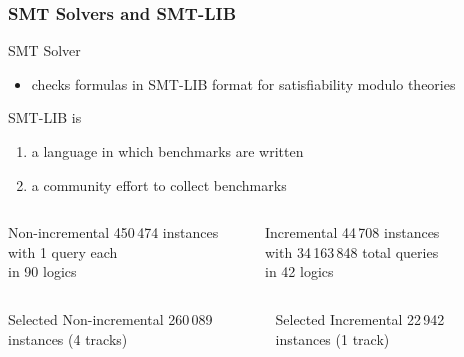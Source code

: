 \documentclass[table]{beamer}
\def\emph#1{\textcolor{MYblue}{#1}}
\begin{document}
\begin{frame}
  \frametitle{SMT Solvers and SMT-LIB}
  SMT Solver
  \begin{itemize}
  \item checks formulas
    in \emph{SMT-LIB} format
    for \emph{satisfiability modulo theories}
  \end{itemize}
  \bigskip

  SMT-LIB is
  \begin{enumerate}
  \item a \emph{language} in which benchmarks are written
  \item a community effort to \emph{collect benchmarks}
  \end{enumerate}
  \medskip

  \begin{columns}
    \begin{column}{0.4\textwidth}
      \begin{block}{Non-incremental}
        450\,474 instances \\
        with 1 query each \\
        in 90 logics
      \end{block}
    \end{column}
    \begin{column}{0.4\textwidth}
      \begin{block}{Incremental}
        44\,708 instances \\
        with 34\,163\,848 total queries \\
        in 42 logics
      \end{block}
    \end{column}
    \begin{column}{0.08\textwidth}
    \end{column}
  \end{columns}
  \pause
    \begin{columns}
    \begin{column}{0.4\textwidth}
      \begin{block}{Selected Non-incremental}
        260\,089 instances (4 tracks)
      \end{block}
    \end{column}
    \begin{column}{0.4\textwidth}
      \begin{block}{Selected Incremental}
        22\,942 instances (1 track)
      \end{block}
    \end{column}
    \begin{column}{0.08\textwidth}
    \end{column}
  \end{columns}

\end{frame}
\end{document}
